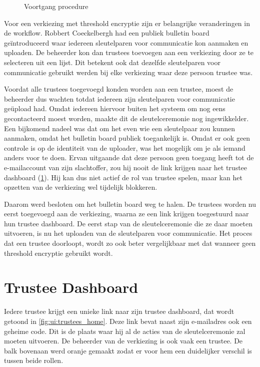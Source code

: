 \begin{figure}
  \caption{Voortgang procedure}
  \label{fig:ui:election_progress}
\end{figure}


\npar Voor een verkiezing met threshold encryptie zijn er belangrijke veranderingen in de workflow. Robbert Coeckelbergh had een publiek bulletin board ge\"introduceerd waar iedereen sleutelparen voor communicatie kon aanmaken en uploaden. De beheerder kon dan trustees toevoegen aan een verkiezing door ze te selecteren uit een lijst. Dit betekent ook dat dezelfde sleutelparen voor communicatie gebruikt werden bij elke verkiezing waar deze persoon trustee was.

\npar Voordat alle trustees toegevoegd konden worden aan een trustee, moest de beheerder dus wachten totdat iedereen zijn sleutelparen voor communicatie ge\"upload had. Omdat iedereen hiervoor buiten het systeem om nog eens gecontacteerd moest worden, maakte dit de sleutelceremonie nog ingewikkelder. Een bijkomend nadeel was dat om het even wie een sleutelpaar zou kunnen aanmaken, omdat het bulletin board publiek toegankelijk is. Omdat er ook geen controle is op de identiteit van de uploader, was het mogelijk om je als iemand anders voor te doen. Ervan uitgaande dat deze persoon geen toegang heeft tot de e-mailaccount van zijn slachtoffer, zou hij nooit de link krijgen naar het trustee dashboard (\ref{sec:ui:trustee_dashboard}). Hij kan dus niet actief de rol van trustee spelen, maar kan het opzetten van de verkiezing wel tijdelijk blokkeren.

\npar Daarom werd besloten om het bulletin board weg te halen. De trustees worden nu eerst toegevoegd aan de verkiezing, waarna ze een link krijgen toegestuurd naar hun trustee dashboard. De eerst stap van de sleutelceremonie die ze daar moeten uitvoeren, is nu het uploaden van de sleutelparen voor communicatie. Het proces dat een trustee doorloopt, wordt zo ook beter vergelijkbaar met dat wanneer geen threshold encryptie gebruikt wordt.

\section{Trustee Dashboard}
\label{sec:ui:trustee_dashboard}

Iedere trustee krijgt een unieke link naar zijn trustee dashboard, dat wordt getoond in \ref{fig:ui:trustees_home}. Deze link bevat naast zijn e-mailadres ook een geheime code. Dit is de plaats waar hij al de acties van de sleutelceremonie zal moeten uitvoeren. De beheerder van de verkiezing is ook vaak een trustee. De balk bovenaan werd oranje gemaakt zodat er voor hem een duidelijker verschil is tussen beide rollen.

